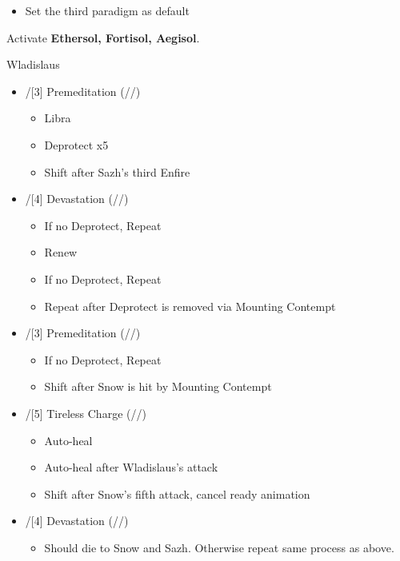 \begin{multicols}{2}
\begin{menu}
\begin{itemize}
    \paradigm
    \begin{itemize}
        \item Set the third paradigm as default
    \end{itemize}
\end{itemize}
\end{menu}
\vfill
\newpage
Activate \textbf{Ethersol, Fortisol, Aegisol}.

\renewcommand{\second}{[2]/[4] Devastation (\sab/\com/\com)}
\renewcommand{\fifth}{[5]/[6] Smart Bomb (\sab/\rav/\rav)}
\renewcommand{\sixth}{[6]/[2] Tri-Disaster (\rav/\rav/\rav)}

\renewcommand{\third}{[3]/[3] Premeditation (\sab/\sen/\syn)}
\renewcommand{\first}{[1]/[5] Tireless Charge (\med/\com/\com)}

\begin{battle}{Wladislaus}
\begin{itemize}
    \item \third
    \begin{itemize}
        \item Libra
        \item Deprotect x5
        \item Shift after Sazh's third Enfire
    \end{itemize}
    \item \second
    \begin{itemize}
        \item If no Deprotect, Repeat
        \item Renew
        \item If no Deprotect, Repeat
        \item Repeat after Deprotect is removed via Mounting Contempt
    \end{itemize}
    \item \third
    \begin{itemize}
        \item If no Deprotect, Repeat
        \item Shift after Snow is hit by Mounting Contempt
    \end{itemize}
    \item \first
    \begin{itemize}
        \item Auto-heal
        \item Auto-heal after Wladislaus's attack
        \item Shift after Snow's fifth attack, cancel ready animation
    \end{itemize}
    \item \second
    \begin{itemize}
        \item Should die to Snow and Sazh. Otherwise repeat same process as above.
    \end{itemize}
\end{itemize}
\end{battle}


\end{multicols}
